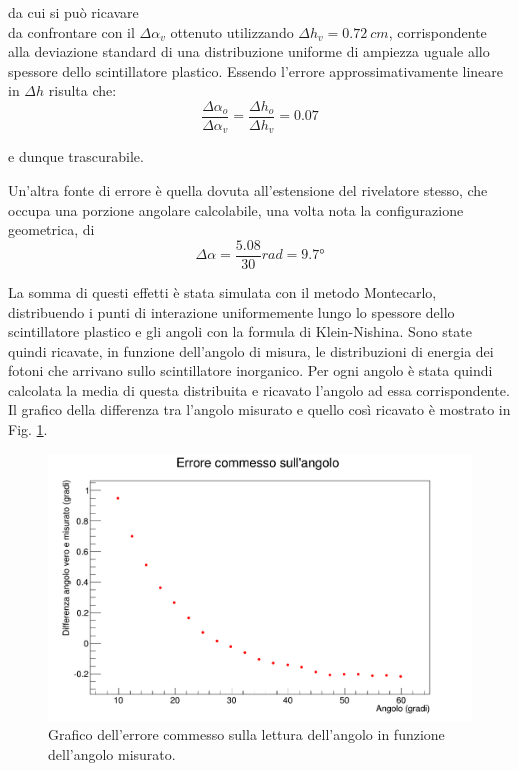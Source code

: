 \documentclass[8pt]{extarticle}
\begin{document}
da cui si può ricavare \\

da confrontare con il $\Delta \alpha_v$ ottenuto utilizzando $\Delta h_v = 0.72 \ cm$, corrispondente alla deviazione standard di una distribuzione uniforme di ampiezza uguale allo spessore dello scintillatore plastico. Essendo l'errore approssimativamente lineare in $\Delta h$ risulta che: \\
\begin{equation}
\frac{\Delta \alpha_o}{\Delta \alpha_v} = \frac{\Delta h_o}{\Delta h_v} = 0.07 
\end{equation}

e dunque trascurabile.

Un'altra fonte di errore è quella dovuta all'estensione del rivelatore stesso, che occupa una porzione angolare calcolabile, una volta nota la configurazione geometrica, di \\
\begin{equation}
\Delta \alpha = \frac{5.08}{30} rad = 9.7°
\nonumber
\end{equation}

La somma di questi effetti è stata simulata con il metodo Montecarlo, distribuendo i punti di interazione uniformemente lungo lo spessore dello scintillatore plastico e gli angoli con la formula di Klein-Nishina. 
Sono state quindi ricavate, in funzione dell'angolo di misura, le distribuzioni di energia dei fotoni che arrivano sullo scintillatore inorganico. Per ogni angolo è stata quindi calcolata la media di questa distribuita e ricavato l'angolo ad essa corrispondente. Il grafico della differenza tra l'angolo misurato e quello così ricavato è mostrato in Fig. \ref{fig:err_ang}.

\begin{figure}
\begin{center}
\includegraphics[scale=0.5]{errore_angolo}
\caption{Grafico dell'errore commesso sulla lettura dell'angolo in funzione dell'angolo misurato.}
\label{fig:err_ang}
\end{center}
\end{figure}
\end{document}
